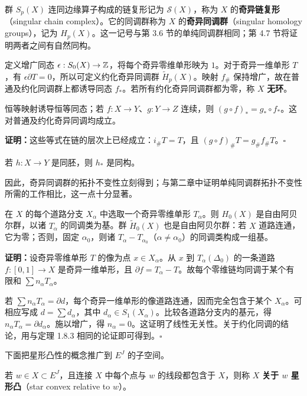 群 $S_p(X)$ 连同边缘算子构成的链复形记为 $\mathcal S(X)$，称为 $X$ 的\textbf{奇异链复形}（singular chain complex）。它的同调群称为 $X$ 的\textbf{奇异同调群}（singular homology groups），记为 $H_p(X)$。这一记号与第 3.6 节的单纯同调群相同；第 4.7 节将证明两者之间有自然同构。

定义增广同态 $\epsilon:S_0(X)\to\mathbb{Z}$，将每个奇异零维单形映为 $1$。对于奇异一维单形 $T$，有 $\epsilon\partial T=0$，所以可定义约化奇异同调群 $\widetilde H_p(X)$。映射 $f_\#$ 保持增广，故在普通及约化同调群上都诱导同态 $f_*$。若所有约化奇异同调群都为零，称 $X$ \textbf{无环}。

恒等映射诱导恒等同态；若 $f:X\to Y$、$g:Y\to Z$ 连续，则 $(g\circ f)_*=g_*\circ f_*$。这对普通及约化奇异同调均成立。

\textbf{证明：}这些等式在链的层次上已经成立：$i_\#T=T$，且 $(g\circ f)_\#T=g_\#f_\#T$。\hfill$\square$

若 $h:X\to Y$ 是同胚，则 $h_*$ 是同构。

因此，奇异同调群的拓扑不变性立刻得到；与第二章中证明单纯同调群拓扑不变性所需的工作相比，这一点十分显著。

在 $X$ 的每个道路分支 $X_\alpha$ 中选取一个奇异零维单形 $T_\alpha$。则 $H_0(X)$ 是自由阿贝尔群，以诸 $T_\alpha$ 的同调类为基。群 $\widetilde H_0(X)$ 也是自由阿贝尔群：若 $X$ 道路连通，它为零；否则，固定 $\alpha_0$，则诸 $T_\alpha-T_{\alpha_0}$（$\alpha\ne\alpha_0$）的同调类构成一组基。

\textbf{证明：}设奇异零维单形 $T$ 的像为点 $x\in X_\alpha$。从 $x$ 到 $T_\alpha(\Delta_0)$ 的一条道路 $f:[0,1]\to X$ 是奇异一维单形，且 $\partial f=T_\alpha-T$。故每个零维链均同调于某个有限和 $\sum n_\alpha T_\alpha$。

若 $\sum n_\alpha T_\alpha=\partial d$，每个奇异一维单形的像道路连通，因而完全包含于某个 $X_\alpha$。可相应写成 $d=\sum d_\alpha$，其中 $d_\alpha\in S_1(X_\alpha)$。比较各道路分支内的基元，得 $n_\alpha T_\alpha=\partial d_\alpha$。施以增广，得 $n_\alpha=0$。这证明了线性无关性。关于约化同调的结论，用与定理 1.8.3 相同的论证即可得到。\hfill$\square$

下面把星形凸性的概念推广到 $E^J$ 的子空间。

若 $w\in X\subset E^J$，且连接 $X$ 中每个点与 $w$ 的线段都包含于 $X$，则称 $X$ \textbf{关于 $w$ 星形凸}（star convex relative to $w$）。

